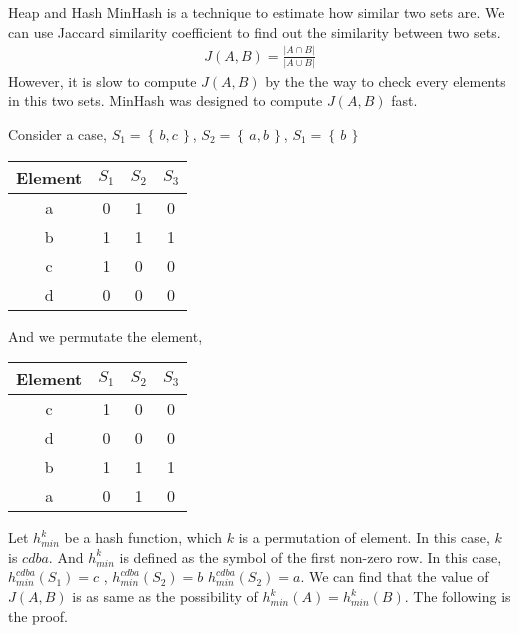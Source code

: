 \begin{homeworkProblem}{Heap and Hash}
        MinHash is a technique to estimate how similar two sets are. We can use
        Jaccard similarity coefficient to find out the similarity between two
        sets.
        \begin{align*}
            J(A,B) = \frac{\left|A \cap B\right|}{\left|A \cup B\right|}
        \end{align*}
        However, it is slow to compute $J(A,B)$ by the the way to check every
        elements in this two sets. MinHash was designed to compute $J(A,B)$ fast.
 
        Consider a case, $S_1=\left\{\,b,c\,\right\}$, $S_2=\left\{\,a,b\,\right\}$,
        $S_1=\left\{\,b\,\right\}$
        \begin{center}
            \begin{tabular}{  c | c | c | c }
                Element & $S_1$ & $S_2$ & $S_3$ \\ \hline \hline
                a & 0 & 1 & 0\\
                b & 1 & 1 & 1\\
                c & 1 & 0 & 0\\
                d & 0 & 0 & 0\\
            \end{tabular}
        \end{center}
        And we permutate the element,
        \begin{center}
            \begin{tabular}{  c | c | c | c }
                Element & $S_1$ & $S_2$ & $S_3$ \\ \hline \hline
                c & 1 & 0 & 0\\
                d & 0 & 0 & 0\\
                b & 1 & 1 & 1\\
                a & 0 & 1 & 0\\
            \end{tabular}
        \end{center}
        Let $h^k_{min}$ be a hash function, which $k$ is a permutation of element.
        In this case, $k$ is $cdba$. And $h^k_{min}$ is defined as the symbol of
        the first non-zero row. In this case, $h^{cdba}_{min}(S_1) = c$ ,
        $h^{cdba}_{min}(S_2) = b$ $h^{cdba}_{min}(S_2) = a$. We can find that
        the value of $J(A,B)$ is as same as the possibility of 
        $h^k_{min}(A) = h^k_{min}(B)$. The following is the proof.


\end{homeworkProblem}
